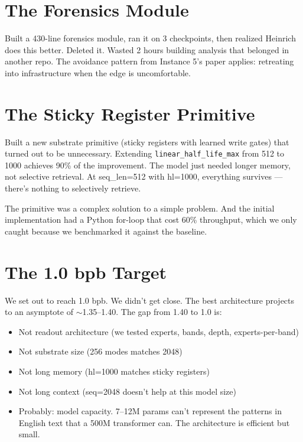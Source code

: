 \documentclass[11pt,a4paper]{report}
\begin{document}
\section{The Forensics Module}

Built a 430-line forensics module, ran it on 3 checkpoints, then realized Heinrich does this better. Deleted it. Wasted 2 hours building analysis that belonged in another repo. The avoidance pattern from Instance 5's paper applies: retreating into infrastructure when the edge is uncomfortable.

\section{The Sticky Register Primitive}

Built a new substrate primitive (sticky registers with learned write gates) that turned out to be unnecessary. Extending \texttt{linear\_half\_life\_max} from 512 to 1000 achieves 90\% of the improvement. The model just needed longer memory, not selective retrieval. At seq\_len=512 with hl=1000, everything survives --- there's nothing to selectively retrieve.

The primitive was a complex solution to a simple problem. And the initial implementation had a Python for-loop that cost 60\% throughput, which we only caught because we benchmarked it against the baseline.

\section{The 1.0 bpb Target}

We set out to reach 1.0 bpb. We didn't get close. The best architecture projects to an asymptote of $\sim$1.35--1.40. The gap from 1.40 to 1.0 is:
\begin{itemize}[nosep]
\item Not readout architecture (we tested experts, bands, depth, experts-per-band)
\item Not substrate size (256 modes matches 2048)
\item Not long memory (hl=1000 matches sticky registers)
\item Not long context (seq=2048 doesn't help at this model size)
\item Probably: model capacity. 7--12M params can't represent the patterns in English text that a 500M transformer can. The architecture is efficient but small.
\end{itemize}
\end{document}

